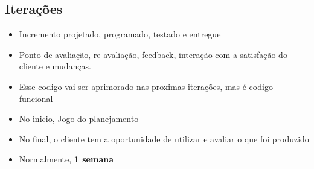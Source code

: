 \documentclass[10pt]{beamer}
\begin{document}
\subsection{Iterações}

\begin{frame}
  \begin{itemize}%
    \item Incremento projetado, programado, testado e entregue
    \item Ponto de avaliação, re-avaliação, feedback, interação com a satisfação do cliente e mudanças.
    \item Esse codigo vai ser aprimorado nas proximas iterações, mas é codigo funcional
    \item No inicio, Jogo do planejamento
    \item No final, o cliente tem a oportunidade de utilizar e avaliar o que foi produzido
    \item Normalmente, \textbf{1 semana}
  \end{itemize}
\end{frame}

\begin{frame}
  \begin{figure}
    \centering
  \end{figure}
\end{frame}
\end{document}
